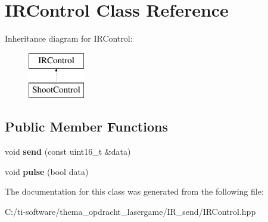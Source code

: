 \hypertarget{class_i_r_control}{}\section{I\+R\+Control Class Reference}
\label{class_i_r_control}
Inheritance diagram for I\+R\+Control\+:\begin{figure}[H]
\begin{center}
\leavevmode
\includegraphics[height=2.000000cm]{class_i_r_control}
\end{center}
\end{figure}
\subsection*{Public Member Functions}
\begin{DoxyCompactItemize}
\item 
\mbox{\label{class_i_r_control_ac16a197b453b4bd18874dbc1ef2d3cf4}} 
void {\bfseries send} (const uint16\+\_\+t \&data)
\item 
\mbox{\label{class_i_r_control_a12e0082a899fc811fa70c5cbe59e18d0}} 
void {\bfseries pulse} (bool data)
\end{DoxyCompactItemize}


The documentation for this class was generated from the following file\+:\begin{DoxyCompactItemize}
\item 
C\+:/ti-\/software/thema\+\_\+opdracht\+\_\+lasergame/\+I\+R\+\_\+send/I\+R\+Control.\+hpp\end{DoxyCompactItemize}
